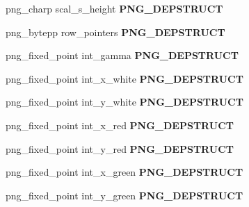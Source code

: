 \begin{DoxyCompactItemize}
\item 
\hypertarget{structpng__info__struct_a077265d96d7e7b4d5977b93054a38010}{png\-\_\-charp scal\-\_\-s\-\_\-height {\bfseries P\-N\-G\-\_\-\-D\-E\-P\-S\-T\-R\-U\-C\-T}}\label{structpng__info__struct_a077265d96d7e7b4d5977b93054a38010}

\item 
\hypertarget{structpng__info__struct_a521d701ad0c2c0b4728b18e2e12464fc}{png\-\_\-bytepp row\-\_\-pointers {\bfseries P\-N\-G\-\_\-\-D\-E\-P\-S\-T\-R\-U\-C\-T}}\label{structpng__info__struct_a521d701ad0c2c0b4728b18e2e12464fc}

\item 
\hypertarget{structpng__info__struct_a5437fde83919c461ff10eb512b08ec3c}{png\-\_\-fixed\-\_\-point int\-\_\-gamma {\bfseries P\-N\-G\-\_\-\-D\-E\-P\-S\-T\-R\-U\-C\-T}}\label{structpng__info__struct_a5437fde83919c461ff10eb512b08ec3c}

\item 
\hypertarget{structpng__info__struct_adaeb99562ef4d72ff5fb445609de912f}{png\-\_\-fixed\-\_\-point int\-\_\-x\-\_\-white {\bfseries P\-N\-G\-\_\-\-D\-E\-P\-S\-T\-R\-U\-C\-T}}\label{structpng__info__struct_adaeb99562ef4d72ff5fb445609de912f}

\item 
\hypertarget{structpng__info__struct_a3266b988d9df7cbfef9d12e7039e04e1}{png\-\_\-fixed\-\_\-point int\-\_\-y\-\_\-white {\bfseries P\-N\-G\-\_\-\-D\-E\-P\-S\-T\-R\-U\-C\-T}}\label{structpng__info__struct_a3266b988d9df7cbfef9d12e7039e04e1}

\item 
\hypertarget{structpng__info__struct_a43e982fd45e5e3984df93e41ee4c2229}{png\-\_\-fixed\-\_\-point int\-\_\-x\-\_\-red {\bfseries P\-N\-G\-\_\-\-D\-E\-P\-S\-T\-R\-U\-C\-T}}\label{structpng__info__struct_a43e982fd45e5e3984df93e41ee4c2229}

\item 
\hypertarget{structpng__info__struct_a1ad93175b3119ab529ba4e03f4cbda05}{png\-\_\-fixed\-\_\-point int\-\_\-y\-\_\-red {\bfseries P\-N\-G\-\_\-\-D\-E\-P\-S\-T\-R\-U\-C\-T}}\label{structpng__info__struct_a1ad93175b3119ab529ba4e03f4cbda05}

\item 
\hypertarget{structpng__info__struct_a093e71129f4594f44c3b6748d729f0a6}{png\-\_\-fixed\-\_\-point int\-\_\-x\-\_\-green {\bfseries P\-N\-G\-\_\-\-D\-E\-P\-S\-T\-R\-U\-C\-T}}\label{structpng__info__struct_a093e71129f4594f44c3b6748d729f0a6}

\item 
\hypertarget{structpng__info__struct_a3fcab9540bfc88288767640e9fb20cf8}{png\-\_\-fixed\-\_\-point int\-\_\-y\-\_\-green {\bfseries P\-N\-G\-\_\-\-D\-E\-P\-S\-T\-R\-U\-C\-T}}\label{structpng__info__struct_a3fcab9540bfc88288767640e9fb20cf8}


\end{DoxyCompactItemize}
